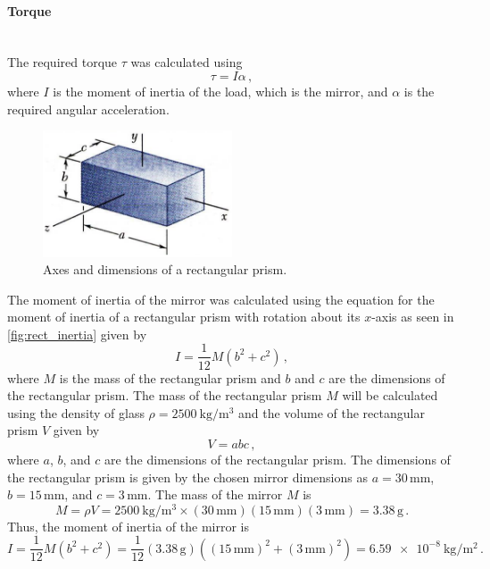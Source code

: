 \paragraph{Torque}\hfill\\
The required torque $\tau$ was calculated using
\begin{equation}
    \tau = I\alpha\,,
    \label{eq:torque}
\end{equation}
where $I$ is the moment of inertia of the load, which is the mirror, and $\alpha$ is the required angular acceleration.

\begin{figure}[h]
    \centering
    \includegraphics[width=0.5\textwidth]{figures/hardware_design/rect_inertia.png}
    \caption{Axes and dimensions of a rectangular prism.}
    \label{fig:rect_inertia}
\end{figure}
The moment of inertia of the mirror was calculated using the equation for the moment of inertia of a rectangular prism with rotation about its $x$-axis as seen in \autoref{fig:rect_inertia} given by
\begin{equation}
    I = \frac{1}{12}M\left(b^2 + c^2\right)\,,
\end{equation}
where $M$ is the mass of the rectangular prism and $b$ and $c$ are the dimensions of the rectangular prism. The mass of the rectangular prism $M$ will be calculated using the density of glass $\rho = \SI{2500}{\kg\per\meter\cubed}$ and the volume of the rectangular prism $V$ given by
\begin{equation}
    V = abc\,,
\end{equation}
where $a$, $b$, and $c$ are the dimensions of the rectangular prism. The dimensions of the rectangular prism is given by the chosen mirror dimensions as $a = 30\,\text{mm}$, $b = 15\,\text{mm}$, and $c = 3\,\text{mm}$. The mass of the mirror $M$ is
\begin{equation}
    M = \rho V = \SI{2500}{\kg\per\meter\cubed} \times (30\,\text{mm})(15\,\text{mm})(3\,\text{mm}) = 3.38\,\text{g}\,.
\end{equation}
Thus, the moment of inertia of the mirror is
\begin{equation}
    I = \frac{1}{12}M\left(b^2 + c^2\right) = \frac{1}{12}(3.38\,\text{g})\left((15\,\text{mm})^2 + (3\,\text{mm})^2\right) = \SI{6.59e-8}{\kg\per\meter\squared}\,.
\end{equation}

